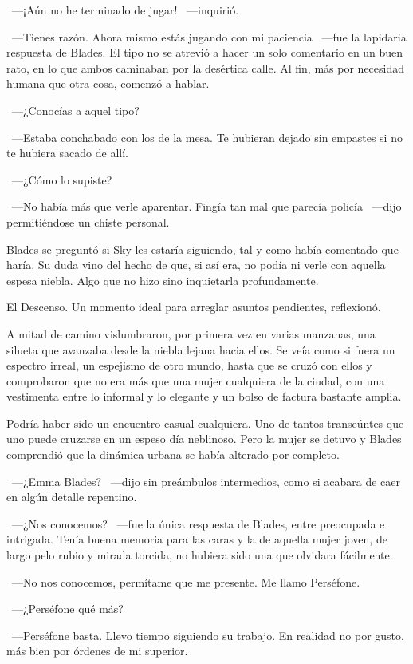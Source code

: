 ~---¡Aún no he terminado de jugar! ~---inquirió.

~---Tienes razón. Ahora mismo estás jugando con mi paciencia ~---fue la lapidaria respuesta de Blades. El tipo no se atrevió a hacer un solo comentario en un buen rato, en lo que ambos caminaban por la desértica calle. Al fin, más por necesidad humana que otra cosa, comenzó a hablar.

~---¿Conocías a aquel tipo?

~---Estaba conchabado con los de la mesa. Te hubieran dejado sin empastes si no te hubiera sacado de allí.

~---¿Cómo lo supiste?

~---No había más que verle aparentar. Fingía tan mal que parecía policía ~---dijo permitiéndose un chiste personal.

Blades se preguntó si Sky les estaría siguiendo, tal y como había comentado que haría. Su duda vino del hecho de que, si así era, no podía ni verle con aquella espesa niebla. Algo que no hizo sino inquietarla profundamente.

El Descenso. Un momento ideal para arreglar asuntos pendientes, reflexionó.

A mitad de camino vislumbraron, por primera vez en varias manzanas, una silueta que avanzaba desde la niebla lejana hacia ellos. Se veía como si fuera un espectro irreal, un espejismo de otro mundo, hasta que se cruzó con ellos y comprobaron que no era más que una mujer cualquiera de la ciudad, con una vestimenta entre lo informal y lo elegante y un bolso de factura bastante amplia.

Podría haber sido un encuentro casual cualquiera. Uno de tantos transeúntes que uno puede cruzarse en un espeso día neblinoso. Pero la mujer se detuvo y Blades comprendió que la dinámica urbana se había alterado por completo.

~---¿Emma Blades? ~---dijo sin preámbulos intermedios, como si acabara de caer en algún detalle repentino.

~---¿Nos conocemos? ~---fue la única respuesta de Blades, entre preocupada e intrigada. Tenía buena memoria para las caras y la de aquella mujer joven, de largo pelo rubio y mirada torcida, no hubiera sido una que olvidara fácilmente.

~---No nos conocemos, permítame que me presente. Me llamo Perséfone.

~---¿Perséfone qué más?
 
~---Perséfone basta. Llevo tiempo siguiendo su trabajo. En realidad no por gusto, más bien por órdenes de mi superior.

